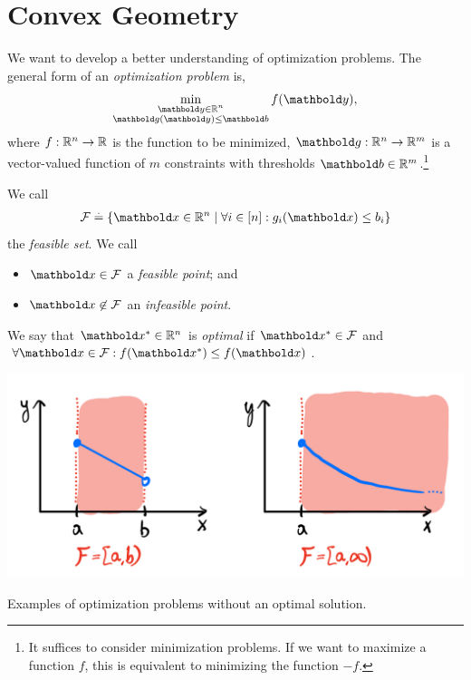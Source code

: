 
\chapter{Convex Geometry}

We want to develop a better understanding of optimization problems. The general form of an \emph{optimization problem} is, \begin{align}
    \min_{\substack{\vy \in \R^n \\ \vg(\vy) \leq \vb}} f(\vy), \label{eq:optimization_problem}
\end{align} where $f : \mathbb{R}^n \to \mathbb{R}$ is the function to be minimized, $\vg : \R^n \to \R^m$ is a vector-valued function of $m$ constraints with thresholds $\vb \in \R^m$.\footnote{It suffices to consider minimization problems. If we want to maximize a function $f$, this is equivalent to minimizing the function $-f$.}

\begin{defn} We call \begin{align}
    \spa{F} \defeq \{\vx \in \R^n \mid \forall i \in [n]: g_i(\vx) \leq b_i\}
\end{align} the \emph{feasible set}. We call \begin{itemize}
    \item $\vx \in \spa{F}$ a \emph{feasible point}; and
    \item $\vx \not\in \spa{F}$ an \emph{infeasible point}.
\end{itemize}
\end{defn}
\begin{defn} We say that $\s{\vx} \in \R^n$ is \emph{optimal} if $\s{\vx} \in \spa{F}$ and $\forall \vx \in \spa{F}: f(\s{\vx}) \leq f(\vx)$.
\end{defn}
\begin{marginfigure}
\includegraphics[width=\textwidth]{notes/figures/no_opt.png}
\caption{Examples of optimization problems without an optimal solution.}
\end{marginfigure}

